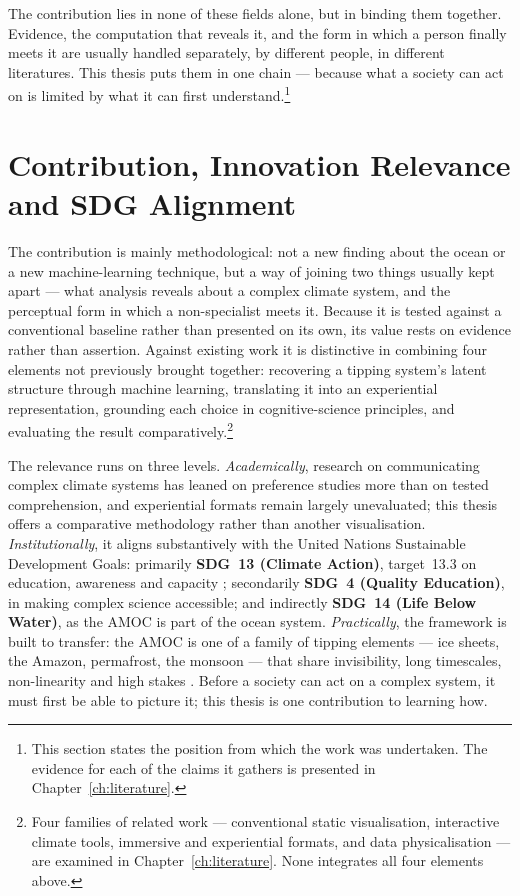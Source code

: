 The contribution lies in none of these fields alone, but in binding them together. Evidence, the computation that reveals it, and the form in which a person finally meets it are usually handled separately, by different people, in different literatures. This thesis puts them in one chain --- because what a society can act on is limited by what it can first understand.\footnote{This section states the position from which the work was undertaken. The evidence for each of the claims it gathers is presented in Chapter~\ref{ch:literature}.}

\section{Contribution, Innovation Relevance and SDG Alignment}
\label{sec:contribution}

The contribution is mainly methodological: not a new finding about the ocean or a new machine-learning technique, but a way of joining two things usually kept apart --- what analysis reveals about a complex climate system, and the perceptual form in which a non-specialist meets it. Because it is tested against a conventional baseline rather than presented on its own, its value rests on evidence rather than assertion. Against existing work it is distinctive in combining four elements not previously brought together: recovering a tipping system's latent structure through machine learning, translating it into an experiential representation, grounding each choice in cognitive-science principles, and evaluating the result comparatively.\footnote{Four families of related work --- conventional static visualisation, interactive climate tools, immersive and experiential formats, and data physicalisation --- are examined in Chapter~\ref{ch:literature}. None integrates all four elements above.}
 
The relevance runs on three levels. \emph{Academically}, research on communicating complex climate systems has leaned on preference studies more than on tested comprehension, and experiential formats remain largely unevaluated; this thesis offers a comparative methodology rather than another visualisation. \emph{Institutionally}, it aligns substantively with the United Nations Sustainable Development Goals: primarily \textbf{SDG~13 (Climate Action)}, target~13.3 on education, awareness and capacity \citep{un2015}; secondarily \textbf{SDG~4 (Quality Education)}, in making complex science accessible; and indirectly \textbf{SDG~14 (Life Below Water)}, as the AMOC is part of the ocean system. \emph{Practically}, the framework is built to transfer: the AMOC is one of a family of tipping elements --- ice sheets, the Amazon, permafrost, the monsoon --- that share invisibility, long timescales, non-linearity and high stakes \citep{armstrongmckay2022, lenton2008}. Before a society can act on a complex system, it must first be able to picture it; this thesis is one contribution to learning how.


